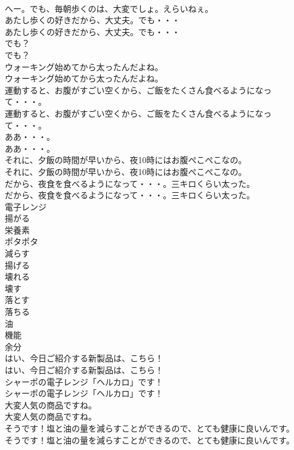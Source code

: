 \documentclass[8pt]{extreport}
\begin{document}
\begin{CJK}{UTF8}{min}
\\	へー。でも、毎朝歩くのは、大変でしょ。えらいねぇ。 
\\	あたし歩くの好きだから、大丈夫。でも・・・	
\\	あたし歩くの好きだから、大丈夫。でも・・・ 
\\	でも？	
\\	でも？ 
\\	ウォーキング始めてから太ったんだよね。	
\\	ウォーキング始めてから太ったんだよね。 
\\	運動すると、お腹がすごい空くから、ご飯をたくさん食べるようになって・・・。	
\\	運動すると、お腹がすごい空くから、ご飯をたくさん食べるようになって・・・。 
\\	ああ・・・。	
\\	ああ・・・。 
\\	それに、夕飯の時間が早いから、夜10時にはお腹ぺこぺこなの。	
\\	それに、夕飯の時間が早いから、夜10時にはお腹ぺこぺこなの。 
\\	だから、夜食を食べるようになって・・・。三キロくらい太った。	
\\	だから、夜食を食べるようになって・・・。三キロくらい太った。 
\\	電子レンジ
\\	揚がる
\\	栄養素
\\	ポタポタ
\\	減らす
\\	揚げる
\\	壊れる
\\	壊す
\\	落とす
\\	落ちる
\\	油
\\	機能
\\	余分
\\	はい、今日ご紹介する新製品は、こちら！	
\\	はい、今日ご紹介する新製品は、こちら！ 
\\	シャーポの電子レンジ「ヘルカロ」です！	
\\	シャーポの電子レンジ「ヘルカロ」です！ 
\\	大変人気の商品ですね。	
\\	大変人気の商品ですね。 
\\	そうです！塩と油の量を減らすことができるので、とても健康に良いんです。	
\\	そうです！塩と油の量を減らすことができるので、とても健康に良いんです。 

\end{CJK}
\end{document}

